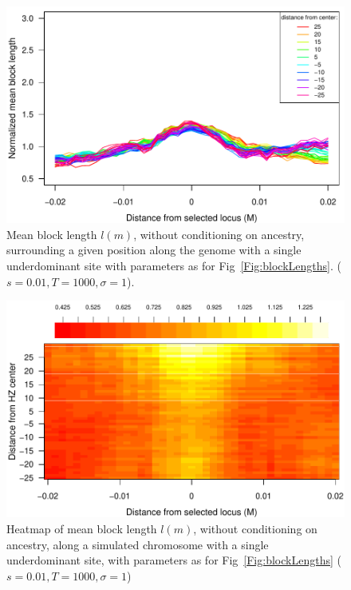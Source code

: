 \begin{figure}
\includegraphics{figs/blocksAlongChromNoConditioning.pdf}
\caption{Mean block length $l(m)$, without conditioning on ancestry, surrounding a given position along the genome with a single underdominant site with parameters as for Fig~\ref{Fig:blockLengths}. ($s=0.01, T=1000, \sigma=1$). }\label{Supp:blockLengthNoAnc}
\end{figure}

\begin{figure}
\includegraphics{figs/blocksAlongChromHeatmap.pdf}
\caption{Heatmap of mean block length $l(m)$, without conditioning on ancestry, along a simulated chromosome with a single underdominant site, with parameters as for Fig~\ref{Fig:blockLengths} ($s=0.01, T=1000, \sigma=1$) }\label{Supp:blockLengthHeatmapNoAnc}
\end{figure}


